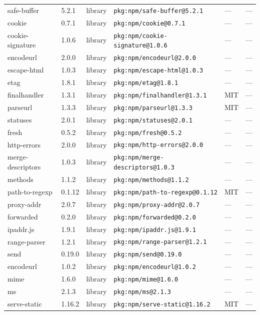 \documentclass[11pt]{article}
\begin{document}
\begin{longtable}{|l|l|l|p{2.2cm}|l|p{4cm}|}
safe-buffer & 5.2.1 & library & \texttt{pkg:npm/safe-buffer@5.2.1} & — & — \\
cookie & 0.7.1 & library & \texttt{pkg:npm/cookie@0.7.1} & — & — \\
cookie-signature & 1.0.6 & library & \texttt{pkg:npm/cookie-signature@1.0.6} & — & — \\
encodeurl & 2.0.0 & library & \texttt{pkg:npm/encodeurl@2.0.0} & — & — \\
escape-html & 1.0.3 & library & \texttt{pkg:npm/escape-html@1.0.3} & — & — \\
etag & 1.8.1 & library & \texttt{pkg:npm/etag@1.8.1} & — & — \\
finalhandler & 1.3.1 & library & \texttt{pkg:npm/finalhandler@1.3.1} & MIT & — \\
parseurl & 1.3.3 & library & \texttt{pkg:npm/parseurl@1.3.3} & MIT & — \\
statuses & 2.0.1 & library & \texttt{pkg:npm/statuses@2.0.1} & — & — \\
fresh & 0.5.2 & library & \texttt{pkg:npm/fresh@0.5.2} & — & — \\
http-errors & 2.0.0 & library & \texttt{pkg:npm/http-errors@2.0.0} & — & — \\
merge-descriptors & 1.0.3 & library & \texttt{pkg:npm/merge-descriptors@1.0.3} & — & — \\
methods & 1.1.2 & library & \texttt{pkg:npm/methods@1.1.2} & — & — \\
path-to-regexp & 0.1.12 & library & \texttt{pkg:npm/path-to-regexp@0.1.12} & MIT & — \\
proxy-addr & 2.0.7 & library & \texttt{pkg:npm/proxy-addr@2.0.7} & — & — \\
forwarded & 0.2.0 & library & \texttt{pkg:npm/forwarded@0.2.0} & — & — \\
ipaddr.js & 1.9.1 & library & \texttt{pkg:npm/ipaddr.js@1.9.1} & — & — \\
range-parser & 1.2.1 & library & \texttt{pkg:npm/range-parser@1.2.1} & — & — \\
send & 0.19.0 & library & \texttt{pkg:npm/send@0.19.0} & — & — \\
encodeurl & 1.0.2 & library & \texttt{pkg:npm/encodeurl@1.0.2} & — & — \\
mime & 1.6.0 & library & \texttt{pkg:npm/mime@1.6.0} & — & — \\
ms & 2.1.3 & library & \texttt{pkg:npm/ms@2.1.3} & — & — \\
serve-static & 1.16.2 & library & \texttt{pkg:npm/serve-static@1.16.2} & MIT & — \\

\end{longtable}
\end{document}
